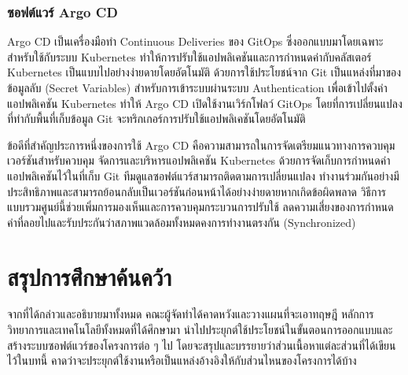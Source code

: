 \documentclass[12pt,one side,openright,a4paper]{cpe-thesis-th}
\newcommand{\thaijustify}[1]{%
  \par\hspace{30pt}\justifying
  #1
}
\begin{document}
        \subsubsection{ซอฟต์แวร์ Argo CD}
            \thaijustify{
                Argo CD เป็นเครื่องมือทำ Continuous Deliveries ของ GitOps ซึ่งออกแบบมาโดยเฉพาะสำหรับใช้กับระบบ Kubernetes ทำให้การปรับใช้แอปพลิเคชันและการกำหนดค่ากับคลัสเตอร์ Kubernetes เป็นแบบไปอย่างง่ายดายโดยอัตโนมัติ ด้วยการใช้ประโยชน์จาก Git เป็นแหล่งที่มาของข้อมูลลับ (Secret Variables) สำหรับการเข้าระบบผ่านระบบ Authentication เพื่อเข้าไปตั้งค่าแอปพลิเคชัน Kubernetes ทำให้ Argo CD เปิดใช้งานเวิร์กโฟลว์ GitOps โดยที่การเปลี่ยนแปลงที่ทำกับพื้นที่เก็บข้อมูล Git จะทริกเกอร์การปรับใช้แอปพลิเคชันโดยอัตโนมัติ~\cite{argodoc}
            }
            \thaijustify{
                ข้อดีที่สำคัญประการหนึ่งของการใช้ Argo CD คือความสามารถในการจัดเตรียมแนวทางการควบคุมเวอร์ชันสำหรับควบคุม จัดการและบริหารแอปพลิเคชัน Kubernetes ด้วยการจัดเก็บการกำหนดค่าแอปพลิเคชันไว้ในที่เก็บ Git ทีมดูแลซอฟต์แวร์สามารถติดตามการเปลี่ยนแปลง ทำงานร่วมกันอย่างมีประสิทธิภาพและสามารถย้อนกลับเป็นเวอร์ชันก่อนหน้าได้อย่างง่ายดายหากเกิดข้อผิดพลาด วิธีการแบบรวมศูนย์นี้ช่วยเพิ่มการมองเห็นและการควบคุมกระบวนการปรับใช้ ลดความเสี่ยงของการกำหนดค่าที่ลอยไปและรับประกันว่าสภาพแวดล้อมทั้งหมดคงการทำงานตรงกัน (Synchronized) ~\cite{argodocsync}
            }
\section{สรุปการศึกษาค้นคว้า}
    \thaijustify{
        จากที่ได้กล่าวและอธิบายมาทั้งหมด คณะผู้จัดทำได้คาดหวังและวางแผนที่จะเอาทฤษฎี หลักการ วิทยาการและเทคโนโลยีทั้งหมดที่ได้ศึกษามา นำไปประยุกต์ใช้ประโยชน์ในขั้นตอนการออกแบบและสร้างระบบซอฟต์แวร์ของโครงการต่อ ๆ ไป โดยจะสรุปและบรรยายว่าส่วนเนื้อหาแต่ละส่วนที่ได้เขียนไว้ในบทนี้ คาดว่าจะประยุกต์ใช้งานหรือเป็นแหล่งอ้างอิงให้กับส่วนไหนของโครงการได้บ้าง
    }
\end{document}
